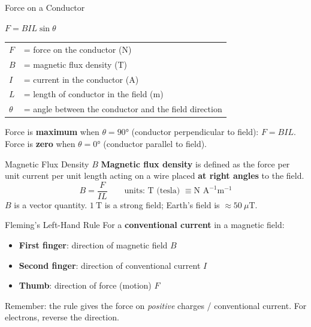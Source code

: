 \begin{formulabox}{Force on a Conductor}
\begin{center}
\Large $F = BIL\sin\theta$
\end{center}
\vspace{0.3em}
\begin{tabular}{@{}ll@{}}
$F$ & = force on the conductor (N) \\
$B$ & = magnetic flux density (T) \\
$I$ & = current in the conductor (A) \\
$L$ & = length of conductor in the field (m) \\
$\theta$ & = angle between the conductor and the field direction \\
\end{tabular}
\vspace{0.4em}

Force is \textbf{maximum} when $\theta = 90°$ (conductor perpendicular to field): $F = BIL$.\\
Force is \textbf{zero} when $\theta = 0°$ (conductor parallel to field).
\end{formulabox}

\begin{definitionbox}{Magnetic Flux Density $B$}
\textbf{Magnetic flux density} is defined as the force per unit current per unit length acting on a wire placed \textbf{at right angles} to the field.
$$B = \frac{F}{IL} \qquad \text{units: T (tesla) } \equiv \text{N A}^{-1}\text{m}^{-1}$$
$B$ is a vector quantity. $1\ \text{T}$ is a strong field; Earth's field is $\approx 50\ \mu\text{T}$.
\end{definitionbox}

\begin{keybox}{Fleming's Left-Hand Rule}
For a \textbf{conventional current} in a magnetic field:
\begin{itemize}[itemsep=2pt]
  \item \textbf{First finger}: direction of magnetic field $B$
  \item \textbf{Second finger}: direction of conventional current $I$
  \item \textbf{Thumb}: direction of force (motion) $F$
\end{itemize}
Remember: the rule gives the force on \emph{positive} charges / conventional current. For electrons, reverse the direction.
\end{keybox}

\begin{center}
\end{center}

